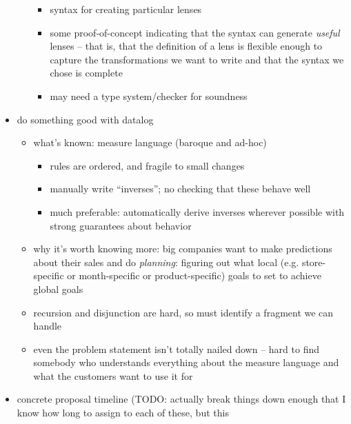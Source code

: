\documentclass{article}
\begin{document}
\begin{itemize}
\begin{itemize}
\begin{itemize}
                    \item syntax for creating particular lenses
                    \item some proof-of-concept indicating that the syntax
                        can generate \emph{useful} lenses -- that is, that
                        the definition of a lens is flexible enough to
                        capture the transformations we want to write and
                        that the syntax we chose is complete
                    \item may need a type system/checker for soundness
                \end{itemize}
        \end{itemize}
    \item do something good with datalog
        \begin{itemize}
            \item what's known: measure language (baroque and ad-hoc)
                \begin{itemize}
                    \item rules are ordered, and fragile to small changes
                    \item manually write ``inverses''; no checking that
                        these behave well
                    \item much preferable: automatically derive inverses
                        wherever possible with strong guarantees about
                        behavior
                \end{itemize}
            \item why it's worth knowing more: big companies want to make
                predictions about their sales and do \emph{planning}:
                figuring out what local (e.g. store-specific or
                month-specific or product-specific) goals to set to achieve
                global goals
            \item recursion and disjunction are hard, so must identify a
                fragment we can handle
            \item even the problem statement isn't totally nailed down --
                hard to find somebody who understands everything about the
                measure language and what the customers want to use it for
        \end{itemize}
    \item concrete proposal timeline (TODO: actually break things down
        enough that I know how long to assign to each of these, but this

\end{itemize}
\end{document}

